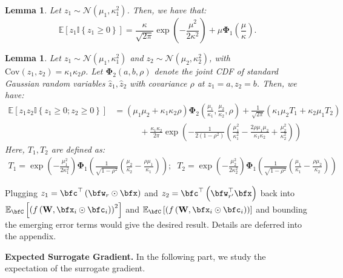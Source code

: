 \documentclass[10pt]{article} %
\newtheorem{lemma}[theorem]{Lemma}
\theoremstyle{definition}
\theoremstyle{plain}
\newcommand{\paren}[1]{\left(#1\right)}
\newcommand{\indy}[1]{\mathbb{I}\left\{#1\right\}}
\providecommand{\E}{\mathbb{E}}
\begin{document}
\begin{lemma}
    \label{lem:first_order_gaus_int}
    Let $z_1\sim\mathcal{N}\paren{\mu_1,\kappa_1^2}$. Then, we have that:
    \[
        \E\left[z_1\indy{z_1\geq 0}\right]= \frac{\kappa}{\sqrt{2\pi}}\exp\paren{-\frac{\mu^2}{2\kappa^2}} + \mu\bm{\Phi}_1\paren{\frac{\mu}{\kappa}}.
    \]
\end{lemma}

\begin{lemma}
    Let $z_1\sim\mathcal{N}\paren{\mu_1,\kappa_1^2}$ and $z_2\sim\mathcal{N}\paren{\mu_2,\kappa_2^2}$, with $\text{Cov}\paren{z_1,z_2} = \kappa_1\kappa_2\rho$. Let $\bm{\Phi}_2\paren{a,b,\rho}$ denote the joint CDF of standard Gaussian random variables $\hat{z}_1,\hat{z}_2$ with covariance $\rho$ at $z_1 = a, z_2=b$. Then, we have:
    \begin{align*}
        \E\left[z_1z_2\mathbb{I}\left\{z_1\geq 0;z_2\geq 0\right\}\right]
        &= \paren{\mu_1\mu_2+\kappa_1\kappa_2\rho}\bm{\Phi}_2\paren{\frac{\mu_1}{\kappa_1},\frac{\mu_2}{\kappa_2},\rho}+ \frac{1}{\sqrt{2\pi}}\paren{\kappa_1\mu_2T_1 +\kappa_2\mu_1T_2}\\
        & \quad\quad\quad + \frac{\kappa_1\kappa_2}{2\pi}\exp\paren{-\frac{1}{2\paren{1-\rho^2}}\paren{\frac{\mu_1^2}{\kappa_1^2} - \frac{2\rho\mu_1\mu_2}{\kappa_1\kappa_2} + \frac{\mu_2^2}{\kappa_2^2}}}
    \end{align*}
    Here, $T_1, T_2$ are defined as:
    \begin{align*}
        T_1 = \exp\paren{-\frac{\mu_1^2}{2\kappa_1^2}}\bm{\Phi}_1\paren{\frac{1}{\sqrt{1-\rho^2}}\paren{\frac{\mu_2}{\kappa_2} - \frac{\rho\mu_1}{\kappa_1}}};\;\; T_2 = \exp\paren{-\frac{\mu_2^2}{2\kappa_2^2}}\bm{\Phi}_1\paren{\frac{1}{\sqrt{1-\rho^2}}\paren{\frac{\mu_1}{\kappa_1} - \frac{\rho\mu_2}{\kappa_2}}}
    \end{align*}
\end{lemma}
Plugging $z_1 = \bfc^\top\paren{\bfw_r\odot\bfx}$ and $z_2 = \bfc^\top\paren{\bfw_{r'}^\top\bfx}$ back into $\E_{\bfC}\left[\paren{f\paren{\mathbf{W},\bfx_i\odot\bfc_i}}^2\right]$ and $\E_{\bfC}\left[\paren{f\paren{\mathbf{W},\bfx_i\odot\bfc_i}}\right]$ and bounding the emerging error terms would give the desired result.
Details are deferred into the appendix.

\textbf{Expected Surrogate Gradient.}
In the following part, we study the expectation of the surrogate gradient.
\end{document}
